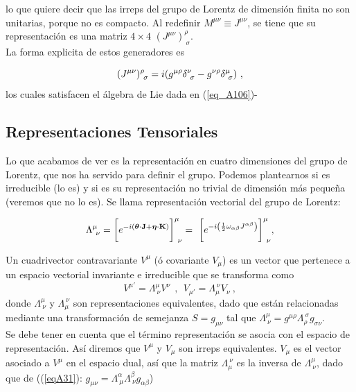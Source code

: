 lo que quiere decir que las irreps del grupo de Lorentz de dimensión finita no son unitarias, porque no es compacto. Al redefinir $M^{\mu \nu}\equiv J^{\mu \nu}$, se tiene que su representación es una matriz $4\times 4$ $(J^{\mu \nu})^{\rho}_{~\sigma}$.\\

La forma explicita de estos generadores es

\begin{equation}
    (J^{\mu \nu})^{\rho}_{~\sigma} = i \qty(g^{\mu \rho} \delta^{\nu}_{~\sigma}-g^{\nu \rho} \delta^{\mu}_{~\sigma})~,
    \label{eqA2.32}
\end{equation}
  los cuales satisfacen el álgebra de Lie dada en (\ref{eq_A106})-

\subsection{Representaciones Tensoriales}

Lo que acabamos de ver es la representación en cuatro dimensiones del grupo de Lorentz, que nos ha servido para definir el grupo. Podemos plantearnos si es irreducible (lo es) y si es su representación no trivial de dimensión más pequeña (veremos que no lo es). Se llama representación vectorial del grupo de Lorentz:

\begin{equation}
    \Lambda^{\mu}_{~\nu}=\qty\bigg[e^{-i\qty(\vb*{\theta} \cdot \vb{J} + \vb*{\eta} \cdot \vb{K}) }]^{\mu}_{~\nu}=~\qty\bigg[e^{-i\qty(\frac{1}{2} \omega_{\alpha \beta}J^{\alpha \beta})}]^{\mu}_{~\nu},
\end{equation}

Un cuadrivector contravariante $V^{\mu}$ (ó covariante $V_{\mu}$) es un vector que pertenece a un espacio vectorial invariante e irreducible que se transforma como
\begin{equation}
    V^{\mu \prime}=\Lambda^{\mu}_{~\nu} V^{\nu}~~,~~V_{\mu \prime}=\Lambda_{\mu}^{~\nu} V_{\nu}~,
 \end{equation}
 donde $\Lambda^{\mu}_{~\nu}$ y $\Lambda_{\mu}^{~\nu}$ son representaciones equivalentes, dado que están relacionadas mediante una transformación de semejanza $S=g_{\mu \nu}$ tal que $\Lambda^{\mu}_{~\nu}=g^{\mu \rho}\Lambda_{\rho}^{~\sigma}g_{\sigma \nu}$.\\

 Se debe tener en cuenta que el término representación se asocia con el espacio de representación. Así diremos que $V^{\mu}$ y $V_{\mu}$ son irreps equivalentes. $V_{\mu}$ es el vector asociado a $V^{\mu}$ en el espacio dual, así que la matriz $\Lambda_{\mu}^{~\nu}$ es la inversa de $\Lambda^{\mu}_{~\nu}$, dado que de ((\ref{eqA31}): $g_{\mu \nu }=\Lambda _{~\mu }^{\alpha }\Lambda _{~\nu }^{\beta}g_{\alpha \beta }$)
 
